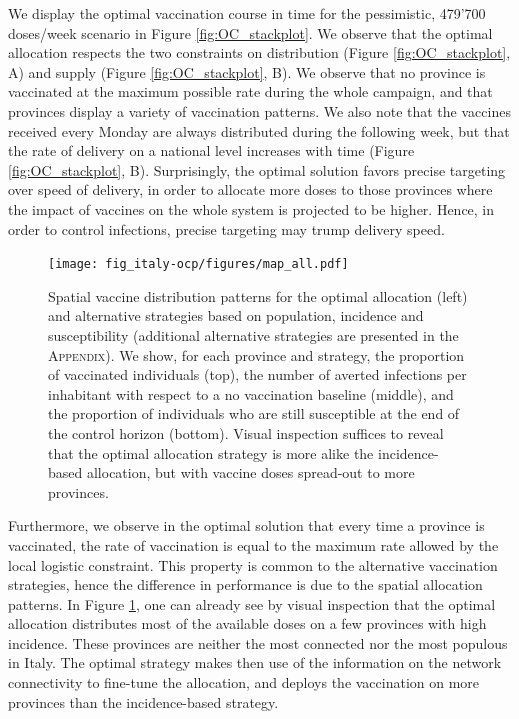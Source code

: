 We display the optimal vaccination course in time for the pessimistic, 479'700 doses/week scenario in Figure \ref{fig:OC_stackplot}. We observe that the optimal allocation respects the two constraints on distribution (Figure \ref{fig:OC_stackplot}, A) and supply (Figure \ref{fig:OC_stackplot}, B). We observe that no province is vaccinated at the maximum possible rate during the whole campaign, and that provinces display a variety of vaccination patterns. We also note that the vaccines received every Monday are always distributed during the following week, but that the rate of delivery on a national level increases with time (Figure \ref{fig:OC_stackplot}, B). Surprisingly, the optimal solution favors precise targeting over speed of delivery, in order to allocate more doses to those provinces where the impact of vaccines on the whole system is projected to be higher. Hence, in order to control infections, precise targeting may trump delivery speed. 

\begin{figure}[!ht]
    \centering
    \texttt{[image: fig\_italy-ocp/figures/map\_all.pdf]}
    \caption[Spatial vaccine distribution patterns]{Spatial vaccine distribution patterns for the optimal allocation (left) and alternative strategies based on population, incidence and susceptibility (additional alternative strategies are presented in the \textsc{Appendix}). We show, for each province and strategy, the proportion of vaccinated individuals (top), the number of averted infections per inhabitant with respect to a no vaccination baseline (middle), and the proportion of individuals who are still susceptible at the end of the control horizon (bottom). Visual inspection suffices to reveal that the optimal allocation strategy is more alike the incidence-based allocation, but with vaccine doses spread-out to more provinces.}
    \label{fig:OC_multimap}
\end{figure}

Furthermore, we observe in the optimal solution that every time a province is vaccinated, the rate of vaccination is equal to the maximum rate allowed by the local logistic constraint. This property is common to the alternative vaccination strategies, hence the difference in performance is due to the spatial allocation patterns.%
In Figure \ref{fig:OC_multimap}, one can already see by visual inspection that the optimal allocation distributes most of the available doses on a few provinces with high incidence. These provinces are neither the most connected nor the most populous in Italy. The optimal strategy makes then use of the information on the network connectivity to fine-tune the allocation, and deploys the vaccination on more provinces than the incidence-based strategy. %

